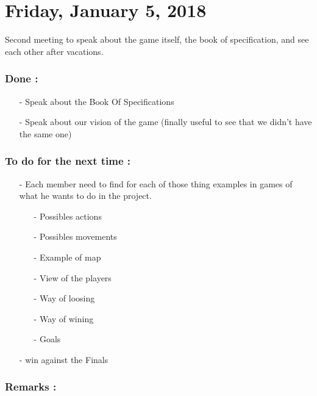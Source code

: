 \documentclass[12pt]{article}
\begin{document}
\section*{Friday, January 5, 2018}
Second meeting to speak about the game itself, the book of specification, and see each other after vacations.
	\subsubsection*{Done :}
      \begin{itemize}
        \item[-] Speak about the Book Of Specifications
        \item[-] Speak about our vision of the game (finally useful to see that we didn't have the same one)
      \end{itemize}
    
    \subsubsection*{To do for the next time :}
      \begin{itemize}
        \item[-] Each member need to find for each of those thing examples in games of what he wants to do in the project.
            \begin{itemize}
                \item[-] Possibles actions
                \item[-] Possibles movements
                \item[-] Example of map
                \item[-] View of the players
                \item[-] Way of loosing
                \item[-] Way of wining
                \item[-] Goals 
            \end{itemize}
        \item[-] win against the Finals
      \end{itemize}
    
	\subsubsection*{Remarks :}
\end{document}
